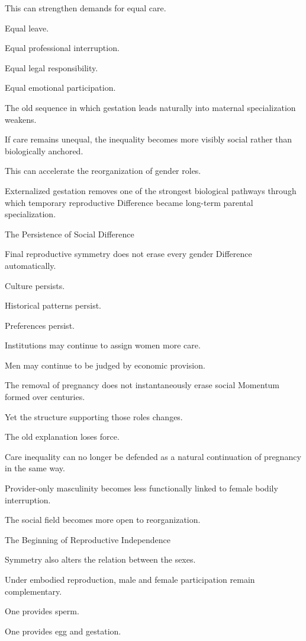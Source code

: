 This can strengthen demands for equal care.

Equal leave.

Equal professional interruption.

Equal legal responsibility.

Equal emotional participation.

The old sequence in which gestation leads naturally into maternal specialization weakens.

If care remains unequal, the inequality becomes more visibly social rather than biologically anchored.

This can accelerate the reorganization of gender roles.

Externalized gestation removes one of the strongest biological pathways through which temporary reproductive Difference became long-term parental specialization.

The Persistence of Social Difference

Final reproductive symmetry does not erase every gender Difference automatically.

Culture persists.

Historical patterns persist.

Preferences persist.

Institutions may continue to assign women more care.

Men may continue to be judged by economic provision.

The removal of pregnancy does not instantaneously erase social Momentum formed over centuries.

Yet the structure supporting those roles changes.

The old explanation loses force.

Care inequality can no longer be defended as a natural continuation of pregnancy in the same way.

Provider-only masculinity becomes less functionally linked to female bodily interruption.

The social field becomes more open to reorganization.

The Beginning of Reproductive Independence

Symmetry also alters the relation between the sexes.

Under embodied reproduction, male and female participation remain complementary.

One provides sperm.

One provides egg and gestation.

